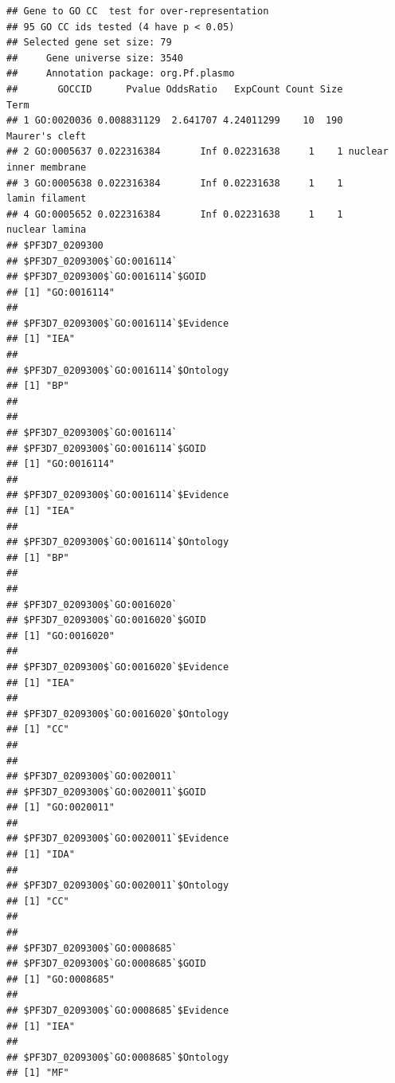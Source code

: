 \documentclass{article}\usepackage[]{graphicx}\usepackage[]{color}
\makeatletter
\newenvironment{kframe}{%
 \def\at@end@of@kframe{}%
 \ifinner\ifhmode%
  \def\at@end@of@kframe{\end{minipage}}%
  \begin{minipage}{\columnwidth}%
 \fi\fi%
 \def\FrameCommand##1{\hskip\@totalleftmargin \hskip-\fboxsep
 \colorbox{shadecolor}{##1}\hskip-\fboxsep
     \hskip-\linewidth \hskip-\@totalleftmargin \hskip\columnwidth}%
 \MakeFramed {\advance\hsize-\width
   \@totalleftmargin\z@ \linewidth\hsize
   \@setminipage}}%
 {\par\unskip\endMakeFramed%
 \at@end@of@kframe}
\newenvironment{knitrout}{}{} %
\makeatother
\begin{document}
\begin{knitrout}
\begin{kframe}
{\ttfamily\noindent\bfseries\color{errorcolor}{\#\# Error: `.x` must be a list, not a `Go3AnnDbBimap` object}}\begin{verbatim}
## Gene to GO CC  test for over-representation 
## 95 GO CC ids tested (4 have p < 0.05)
## Selected gene set size: 79 
##     Gene universe size: 3540 
##     Annotation package: org.Pf.plasmo
##       GOCCID      Pvalue OddsRatio   ExpCount Count Size                   Term
## 1 GO:0020036 0.008831129  2.641707 4.24011299    10  190         Maurer's cleft
## 2 GO:0005637 0.022316384       Inf 0.02231638     1    1 nuclear inner membrane
## 3 GO:0005638 0.022316384       Inf 0.02231638     1    1         lamin filament
## 4 GO:0005652 0.022316384       Inf 0.02231638     1    1         nuclear lamina
## $PF3D7_0209300
## $PF3D7_0209300$`GO:0016114`
## $PF3D7_0209300$`GO:0016114`$GOID
## [1] "GO:0016114"
## 
## $PF3D7_0209300$`GO:0016114`$Evidence
## [1] "IEA"
## 
## $PF3D7_0209300$`GO:0016114`$Ontology
## [1] "BP"
## 
## 
## $PF3D7_0209300$`GO:0016114`
## $PF3D7_0209300$`GO:0016114`$GOID
## [1] "GO:0016114"
## 
## $PF3D7_0209300$`GO:0016114`$Evidence
## [1] "IEA"
## 
## $PF3D7_0209300$`GO:0016114`$Ontology
## [1] "BP"
## 
## 
## $PF3D7_0209300$`GO:0016020`
## $PF3D7_0209300$`GO:0016020`$GOID
## [1] "GO:0016020"
## 
## $PF3D7_0209300$`GO:0016020`$Evidence
## [1] "IEA"
## 
## $PF3D7_0209300$`GO:0016020`$Ontology
## [1] "CC"
## 
## 
## $PF3D7_0209300$`GO:0020011`
## $PF3D7_0209300$`GO:0020011`$GOID
## [1] "GO:0020011"
## 
## $PF3D7_0209300$`GO:0020011`$Evidence
## [1] "IDA"
## 
## $PF3D7_0209300$`GO:0020011`$Ontology
## [1] "CC"
## 
## 
## $PF3D7_0209300$`GO:0008685`
## $PF3D7_0209300$`GO:0008685`$GOID
## [1] "GO:0008685"
## 
## $PF3D7_0209300$`GO:0008685`$Evidence
## [1] "IEA"
## 
## $PF3D7_0209300$`GO:0008685`$Ontology
## [1] "MF"
\end{verbatim}
\end{kframe}
\end{knitrout}
\end{document}
